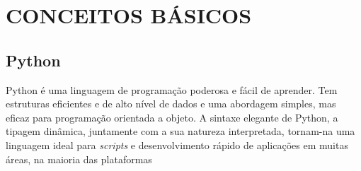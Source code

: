 \chapter{CONCEITOS BÁSICOS}

\section{Python}
Python é uma linguagem de programação poderosa e fácil de aprender. Tem estruturas eficientes e de alto nível de dados e uma abordagem simples, mas eficaz para programação orientada a objeto. A sintaxe elegante de Python, a tipagem dinâmica, juntamente com a sua natureza interpretada, tornam-na  uma linguagem ideal para \textit{scripts} e desenvolvimento rápido de aplicações em muitas áreas, na maioria das plataformas \cite{Guido 2003}

